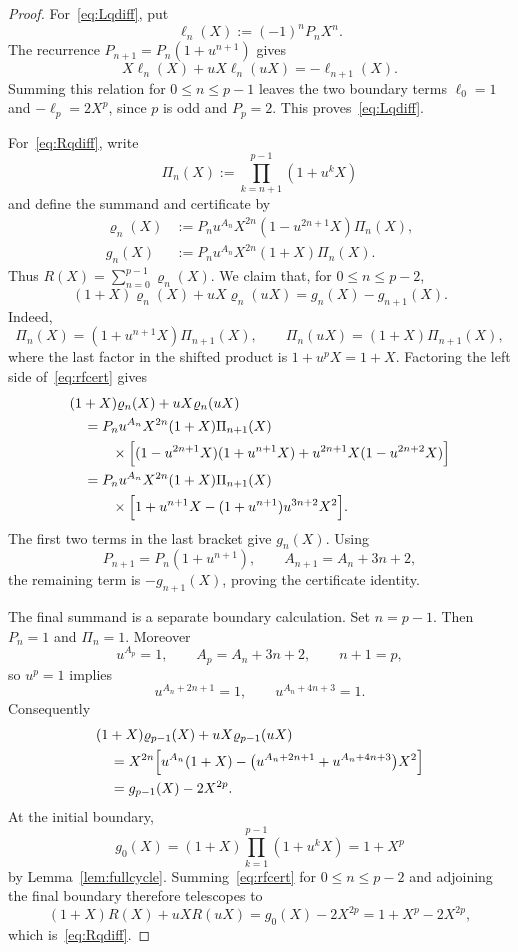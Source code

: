 \documentclass[11pt]{article}
\theoremstyle{definition}
\begin{document}
\begin{proof}
For~\eqref{eq:Lqdiff}, put
\[
  \ell_n(X):=(-1)^nP_nX^n.
\]
The recurrence $P_{n+1}=P_n(1+u^{n+1})$ gives
\[
  X\ell_n(X)+uX\ell_n(uX)=-\ell_{n+1}(X).
\]
Summing this relation for $0\le n\le p-1$ leaves the two boundary
terms $\ell_0=1$ and $-\ell_p=2X^p$, since $p$ is odd and $P_p=2$.
This proves~\eqref{eq:Lqdiff}.

For~\eqref{eq:Rqdiff}, write
\[
  \Pi_n(X):=\prod_{k=n+1}^{p-1}(1+u^kX)
\]
and define the summand and certificate by
\begin{align*}
  \varrho_n(X)
  &:=P_nu^{A_n}X^{2n}(1-u^{2n+1}X)\Pi_n(X),\\
  g_n(X)
  &:=P_nu^{A_n}X^{2n}(1+X)\Pi_n(X).
\end{align*}
Thus $R(X)=\sum_{n=0}^{p-1}\varrho_n(X)$.  We claim that, for
$0\le n\le p-2$,
\begin{equation}\label{eq:rfcert}
  (1+X)\varrho_n(X)+uX\varrho_n(uX)
  =g_n(X)-g_{n+1}(X).
\end{equation}
Indeed,
\[
  \Pi_n(X)=(1+u^{n+1}X)\Pi_{n+1}(X),
  \qquad
  \Pi_n(uX)=(1+X)\Pi_{n+1}(X),
\]
where the last factor in the shifted product is
$1+u^pX=1+X$.  Factoring the left side of~\eqref{eq:rfcert} gives
\begin{align*}
 &(1+X)\varrho_n(X)+uX\varrho_n(uX)\\
 &\quad=P_nu^{A_n}X^{2n}(1+X)\Pi_{n+1}(X)\\
 &\qquad\quad\times\Bigl[
   (1-u^{2n+1}X)(1+u^{n+1}X)
   +u^{2n+1}X(1-u^{2n+2}X)
 \Bigr]\\
 &\quad=P_nu^{A_n}X^{2n}(1+X)\Pi_{n+1}(X)\\
 &\qquad\quad\times\Bigl[
   1+u^{n+1}X-(1+u^{n+1})u^{3n+2}X^2
 \Bigr].
\end{align*}
The first two terms in the last bracket give $g_n(X)$.  Using
\[
  P_{n+1}=P_n(1+u^{n+1}),
  \qquad
  A_{n+1}=A_n+3n+2,
\]
the remaining term is $-g_{n+1}(X)$, proving the certificate identity.

The final summand is a separate boundary calculation.  Set $n=p-1$.
Then $P_n=1$ and $\Pi_n=1$.  Moreover
\[
  u^{A_p}=1,
  \qquad
  A_p=A_n+3n+2,
  \qquad
  n+1=p,
\]
so $u^p=1$ implies
\[
  u^{A_n+2n+1}=1,
  \qquad
  u^{A_n+4n+3}=1.
\]
Consequently
\begin{align*}
 &(1+X)\varrho_{p-1}(X)+uX\varrho_{p-1}(uX)\\
 &\quad=X^{2n}\Bigl[
   u^{A_n}(1+X)
   -\bigl(u^{A_n+2n+1}+u^{A_n+4n+3}\bigr)X^2
 \Bigr]\\
 &\quad=g_{p-1}(X)-2X^{2p}.
\end{align*}
At the initial boundary,
\[
  g_0(X)=(1+X)\prod_{k=1}^{p-1}(1+u^kX)=1+X^p
\]
by Lemma~\ref{lem:fullcycle}.  Summing~\eqref{eq:rfcert} for
$0\le n\le p-2$ and adjoining the final boundary therefore telescopes to
\[
  (1+X)R(X)+uXR(uX)=g_0(X)-2X^{2p}
  =1+X^p-2X^{2p},
\]
which is~\eqref{eq:Rqdiff}.
\end{proof}
\end{document}

